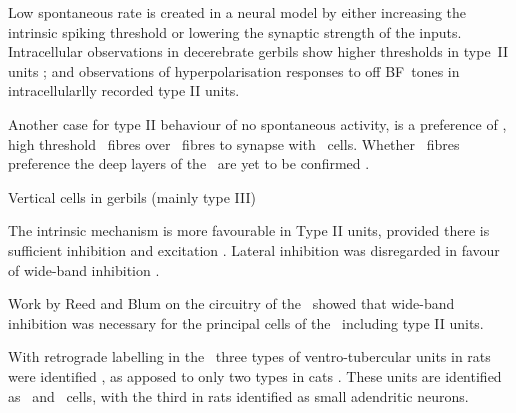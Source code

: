 Low spontaneous rate is created in a neural model by either increasing the
intrinsic spiking threshold or lowering the synaptic strength of the
inputs. Intracellular observations in decerebrate gerbils show higher thresholds
in type~II units \citep{DingVoigt:1997}; and observations of hyperpolarisation
responses to off \gls{BF}~tones in intracellularlly recorded type II units.


Another case for type II behaviour of no spontaneous activity, is a preference
of \LSR, high threshold \AN~fibres over \HSR~fibres to synapse with
\TV~cells. Whether \LSR~fibres preference the deep layers of the \CN~are yet to
be confirmed
\citep{Ryugo:2008,MeltzerRyugo:2006,RyugoParks:2003,BabalianJacommeEtAl:2002}.


\citep{Rhode:1999} Vertical cells in gerbils (mainly type III)


The intrinsic mechanism is more favourable in Type II units, provided there is
sufficient inhibition and excitation \citep{HancockDavisEtAl:1997}. Lateral
inhibition was disregarded in favour of wide-band inhibition
\citep{HancockDavisEtAl:1997}.


Work by Reed and Blum
\citep{ReedBlum:1995,BlumReedEtAl:1995,ReedBlum:1997,BlumReed:1998} on the
circuitry of the \DCN~showed that wide-band inhibition was necessary for the
principal cells of the \DCN~including type II units.


With retrograde labelling in the \DCN~three types of ventro-tubercular units in
rats were identified \citet{FriedlandPongstapornEtAl:2003}, as apposed to only
two types in cats \citep{SmithRhode:1989,OertelWuEtAl:1990}. These units are
identified as \TS~and \DS~cells, with the third in rats identified as small
adendritic neurons.










